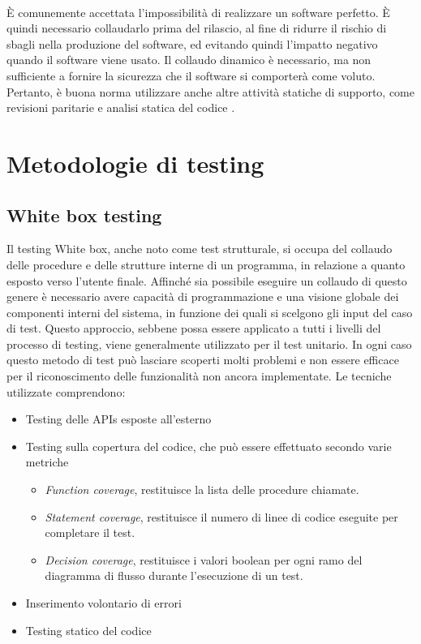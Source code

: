 \documentclass[../main.tex]{subfiles}
\begin{document}
\paragraph{}
È comunemente accettata l'impossibilità di realizzare un software perfetto. È quindi necessario collaudarlo prima del rilascio, al fine di ridurre il rischio di sbagli nella produzione del software, ed evitando quindi l'impatto negativo quando il software viene usato.
Il collaudo dinamico è necessario, ma non sufficiente a fornire la sicurezza che il software si comporterà come voluto. Pertanto, è buona norma utilizzare anche altre attività statiche di supporto, come revisioni paritarie e analisi statica del codice \cite{iso29119}.
\section{Metodologie di testing}
\subsection{White box testing}
Il testing White box, anche noto come test strutturale, si occupa del collaudo delle procedure e delle strutture interne di un programma, in relazione a quanto esposto verso l'utente finale.
Affinché sia possibile eseguire un collaudo di questo genere è necessario avere capacità di programmazione e una visione globale dei componenti interni del sistema, in funzione dei quali si scelgono gli input del caso di test.
Questo approccio, sebbene possa essere applicato a tutti i livelli del processo di testing, viene generalmente utilizzato per il test unitario.
In ogni caso questo metodo di test può lasciare scoperti molti problemi e non essere efficace per il riconoscimento delle funzionalità non ancora implementate.
Le tecniche utilizzate comprendono:
\begin{itemize}
\item Testing delle APIs esposte all'esterno
\item Testing sulla copertura del codice, che può essere effettuato secondo varie metriche
\begin{itemize}
\item \textit{Function coverage}, restituisce la lista delle procedure chiamate.
\item \textit{Statement coverage}, restituisce il numero di linee di codice eseguite per completare il test.
\item \textit{Decision coverage}, restituisce i valori boolean per ogni ramo del diagramma di flusso durante l'esecuzione di un test.
\end{itemize}
\item Inserimento volontario di errori
\item Testing statico del codice
\end{itemize}
\end{document}
